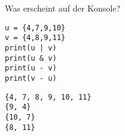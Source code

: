 \question[3] Was erscheint auf der Konsole?
\begin{lstlisting}
u = {4,7,9,10}
v = {4,8,9,11}
print(u | v)
print(u & v)
print(u - v)
print(v - u)
\end{lstlisting}
\begin{solutionbox}{4cm}
\begin{lstlisting}
{4, 7, 8, 9, 10, 11}
{9, 4}
{10, 7}
{8, 11}
\end{lstlisting}
\end{solutionbox}
